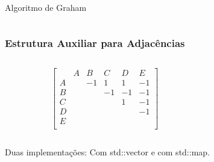 \documentclass[aspectratio=169,usenames,dvipsnames]{beamer}
\begin{document}
\begin{frame}{Algoritmo de Graham}
  \begin{columns}
    \begin{column}{0.5\textwidth}
      
    \end{column}
    \begin{column}{0.5\textwidth}
        \begin{itemize}
        \end{itemize}
    \end{column}
  \end{columns}
\end{frame}

\begin{frame}
  \frametitle{Estrutura Auxiliar para Adjacências}
  
  \begin{columns}
   \begin{column}{0.5\textwidth}
  \[
  \begin{bmatrix}
      & A & B & C & D & E \\
  A &   & -1 & 1 &  1& -1 \\
  B &   &    & -1  & -1  & -1 \\
  C &   &    &    & 1  & -1 \\
  D &   &    &    &    & -1 \\
  E &   &    &    &    &   \\
  \end{bmatrix}
  \]
   \end{column} 
   \begin{column}{0.5\textwidth}
    
    
   \end{column} 
  \end{columns}

  Duas implementações: Com std::vector e com std::map.
  
 \end{frame}
\end{document}
